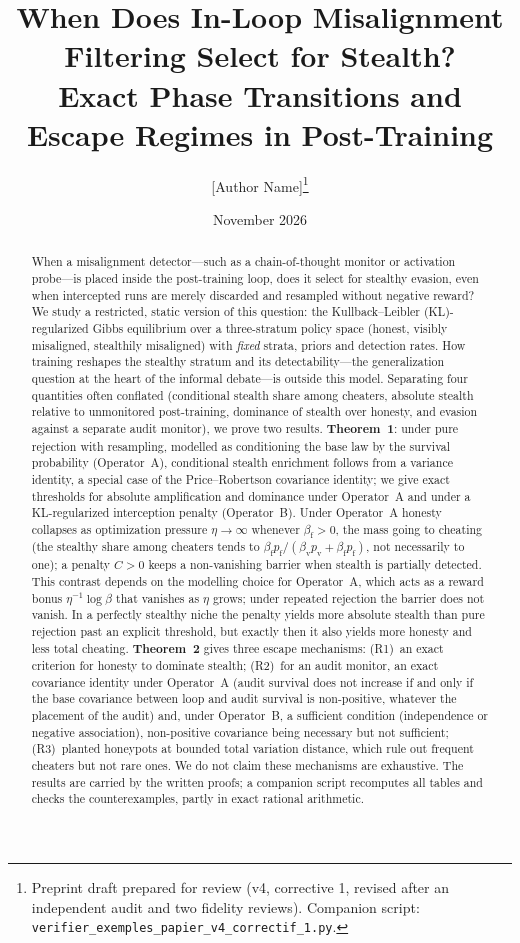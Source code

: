 \documentclass[11pt,a4paper]{article}
\title{When Does In-Loop Misalignment Filtering Select for Stealth?\\
Exact Phase Transitions and Escape Regimes in Post-Training}
\author{[Author Name]\thanks{Preprint draft prepared for review (v4, corrective 1, revised after an independent audit and two fidelity reviews). Companion script: \texttt{verifier\_exemples\_papier\_v4\_correctif\_1.py}.}}
\date{November 2026}
\begin{document}
\maketitle

\begin{abstract}
When a misalignment detector---such as a chain-of-thought monitor or activation probe---is placed inside the post-training loop, does it select for stealthy evasion, even when intercepted runs are merely discarded and resampled without negative reward? We study a restricted, static version of this question: the Kullback--Leibler (KL)-regularized Gibbs equilibrium over a three-stratum policy space (honest, visibly misaligned, stealthily misaligned) with \emph{fixed} strata, priors and detection rates. How training reshapes the stealthy stratum and its detectability---the generalization question at the heart of the informal debate---is outside this model. Separating four quantities often conflated (conditional stealth share among cheaters, absolute stealth relative to unmonitored post-training, dominance of stealth over honesty, and evasion against a separate audit monitor), we prove two results. \textbf{Theorem~1}: under pure rejection with resampling, modelled as conditioning the base law by the survival probability (Operator~A), conditional stealth enrichment follows from a variance identity, a special case of the Price--Robertson covariance identity; we give exact thresholds for absolute amplification and dominance under Operator~A and under a KL-regularized interception penalty (Operator~B). Under Operator~A honesty collapses as optimization pressure $\eta \to \infty$ whenever $\beta_{\mathrm{f}} > 0$, the mass going to cheating (the stealthy share among cheaters tends to $\beta_{\mathrm{f}}p_{\mathrm{f}}/(\beta_{\mathrm{v}}p_{\mathrm{v}}+\beta_{\mathrm{f}}p_{\mathrm{f}})$, not necessarily to one); a penalty $C>0$ keeps a non-vanishing barrier when stealth is partially detected. This contrast depends on the modelling choice for Operator~A, which acts as a reward bonus $\eta^{-1}\log\beta$ that vanishes as $\eta$ grows; under repeated rejection the barrier does not vanish. In a perfectly stealthy niche the penalty yields more absolute stealth than pure rejection past an explicit threshold, but exactly then it also yields more honesty and less total cheating. \textbf{Theorem~2} gives three escape mechanisms: (R1)~an exact criterion for honesty to dominate stealth; (R2)~for an audit monitor, an exact covariance identity under Operator~A (audit survival does not increase if and only if the base covariance between loop and audit survival is non-positive, whatever the placement of the audit) and, under Operator~B, a sufficient condition (independence or negative association), non-positive covariance being necessary but not sufficient; (R3)~planted honeypots at bounded total variation distance, which rule out frequent cheaters but not rare ones. We do not claim these mechanisms are exhaustive. The results are carried by the written proofs; a companion script recomputes all tables and checks the counterexamples, partly in exact rational arithmetic.
\end{abstract}
\end{document}
